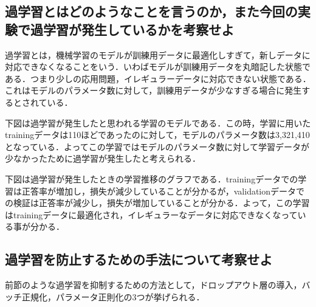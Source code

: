 \documentclass[uplatex,titlepage]{jsarticle}
\newif\iffigure
\begin{document}
\subsection{過学習とはどのようなことを言うのか，また今回の実験で過学習が発生しているかを考察せよ}
過学習とは，機械学習のモデルが訓練用データに最適化しすぎて，新しデータに対応できなくなることをいう．いわばモデルが訓練用データを丸暗記した状態である．つまり少しの応用問題，イレギュラーデータに対応できない状態である．これはモデルのパラメータ数に対して，訓練用データが少なすぎる場合に発生するとされている．\par
下図は過学習が発生したと思われる学習のモデルである．この時，学習に用いたtrainingデータは110ほどであったのに対して，モデルのパラメータ数は3,321,410となっている．よってこの学習ではモデルのパラメータ数に対して学習データが少なかったために過学習が発生したと考えられる．
\iffigure
\begin{figure}[H]%
    \begin{center}
    \texttt{[image: overfit\_model.png]} 
    \caption{過学習が発生した時のモデル}
    \end{center}
\end{figure}
\fi

下図は過学習が発生したときの学習推移のグラフである．trainingデータでの学習は正答率が増加し，損失が減少していることが分かるが，validationデータでの検証は正答率が減少し，損失が増加していることが分かる．よって，この学習はtrainingデータに最適化され，イレギュラーなデータに対応できなくなっている事が分かる．
\iffigure
\begin{figure}[H]
\begin{minipage}{8cm}%
  \begin{center}
   \texttt{[image: ker\_CNN\_acc.png]} \\
   \caption{過学習と考えられる正答率の推移}
  \end{center}
\end{minipage}
\hfill
\begin{minipage}{8cm}%
  \begin{center}
    \texttt{[image: ker\_CNN\_loss.png]} \\
    \caption{過学習と考えられる損失の推移}
  \end{center}
\end{minipage}
\end{figure}
\fi


\subsection{過学習を防止するための手法について考察せよ}
前節のような過学習を抑制するための方法として，ドロップアウト層の導入，バッチ正規化，パラメータ正則化の3つが挙げられる．
\end{document}
